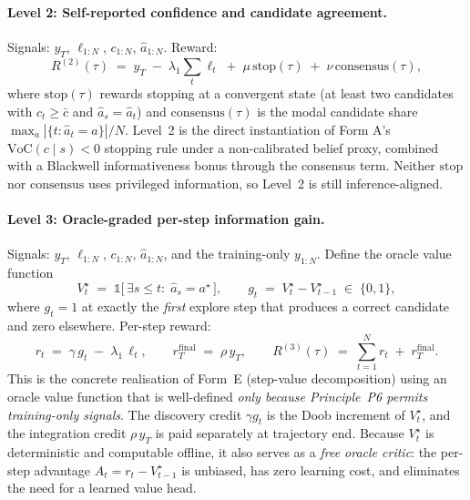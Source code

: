 \paragraph{Level 2: Self-reported confidence and candidate agreement.}
Signals: $y_T$, $\ell_{1:N}$, $c_{1:N}$, $\hat a_{1:N}$. Reward:
\begin{equation}
R^{(2)}(\tau) \;=\; y_T \;-\; \lambda_1 \sum_{t} \ell_t \;+\; \mu\,\mathrm{stop}(\tau) \;+\; \nu\,\mathrm{consensus}(\tau),
\label{eq:reward-level2}
\end{equation}
where $\mathrm{stop}(\tau)$ rewards stopping at a convergent state (at least two candidates with $c_t \ge \bar c$ and $\hat a_s = \hat a_t$) and $\mathrm{consensus}(\tau)$ is the modal candidate share $\max_a |\{t : \hat a_t = a\}|/N$. Level~2 is the direct instantiation of Form A's $\mathrm{VoC}(c\mid s) < 0$ stopping rule under a non-calibrated belief proxy, combined with a Blackwell informativeness bonus through the consensus term. Neither $\mathrm{stop}$ nor $\mathrm{consensus}$ uses privileged information, so Level~2 is still inference-aligned.

\paragraph{Level 3: Oracle-graded per-step information gain.}
Signals: $y_T$, $\ell_{1:N}$, $c_{1:N}$, $\hat a_{1:N}$, and the training-only $y_{1:N}$. Define the oracle value function
\begin{equation}
V^\star_t \;=\; \mathbb{1}\bigl[\,\exists s \le t:\; \hat a_s = a^\star\,\bigr],
\qquad
g_t \;=\; V^\star_t - V^\star_{t-1} \;\in\;\{0,1\},
\label{eq:oracle-gain}
\end{equation}
where $g_t = 1$ at exactly the \emph{first} explore step that produces a correct candidate and zero elsewhere. Per-step reward:
\begin{equation}
r_t \;=\; \gamma\,g_t \;-\; \lambda_1\,\ell_t,
\qquad
r_T^{\mathrm{final}} \;=\; \rho\,y_T,
\qquad
R^{(3)}(\tau) \;=\; \sum_{t=1}^{N} r_t \;+\; r_T^{\mathrm{final}}.
\label{eq:reward-level3}
\end{equation}
This is the concrete realisation of Form~E (step-value decomposition) using an oracle value function that is well-defined \emph{only because Principle~P6 permits training-only signals}. The discovery credit $\gamma g_t$ is the Doob increment of $V^\star_t$, and the integration credit $\rho\,y_T$ is paid separately at trajectory end. Because $V^\star_t$ is deterministic and computable offline, it also serves as a \emph{free oracle critic}: the per-step advantage $A_t = r_t - V^\star_{t-1}$ is unbiased, has zero learning cost, and eliminates the need for a learned value head.

